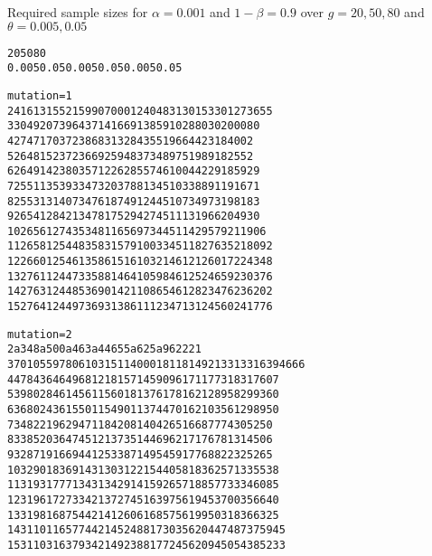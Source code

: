 \begin{table}[h]
\caption{Required sample sizes for $\alpha=0.001$ and $1-\beta=0.9$ over
$g=20, 50, 80$ and $\theta=0.005, 0.05$\label{table4_1}}
\end{table}
\begin{alltt}
               20                    50                         80
       0.005      0.05       0.005        0.05         0.005         0.05

mutation=1
2    41   61   315   521    59   90   7000  12404    83  130   153301  273655
3    30   49   207   396    43   71   4166   9138    59  102    88030  200080
4    27   47   170   372    38   68   3132   8435    51   96    64423  184002
5    26   48   152   372    36   69   2594   8373    48   97    51989  182552
6    26   49   142   380    35   71   2262   8557    46  100    44229  185929
7    25   51   135   393    34   73   2037   8813    45  103    38891  191671
8    25   53   131   407    34   76   1874   9124    45  107    34973  198183
9    26   54   128   421    34   78   1752   9427    45  111    31966  204930
10   26   56   127   435    34   81   1656   9734    45  114    29579  211906
11   26   58   125   448    35   83   1579  10033    45  118    27635  218092
12   26   60   125   461    35   86   1516  10321    46  121    26017  224348
13   27   61   124   473    35   88   1464  10598    46  125    24659  230376
14   27   63   124   485    36   90   1421  10865    46  128    23476  236202
15   27   64   124   497    36   93   1386  11123    47  131    24560  241776

mutation=2
2     a  348     a   500     a  463      a  44655     a  625        a  962221
3    70  105   597   806   103  151  14000  18118   149  213   313316  394666
4    47   84   364   649    68  121   8157  14590    96  171   177318  317607
5    39   80   284   614    56  115   6018  13761    78  162   128958  299360
6    36   80   243   615    50  115   4901  13744    70  162   103561  298950
7    34   82   219   629    47  118   4208  14042    65  166    87774  305250
8    33   85   203   647    45  121   3735  14469    62  171    76781  314506
9    32   87   191   669    44  125   3387  14954    59  177    68822  325265
10   32   90   183   691    43  130   3122  15440    58  183    62571  335538
11   31   93   177   713    43  134   2914  15926    57  188    57733  346085
12   31   96   172   733    42  137   2745  16397    56  194    53700  356640
13   31   98   168   754    42  141   2606  16857    56  199    50318  366325
14   31  101   165   774    42  145   2488  17303    56  204    47487  375945
15   31  103   163   793    42  149   2388  17724    56  209    45054  385233



\end{alltt}
